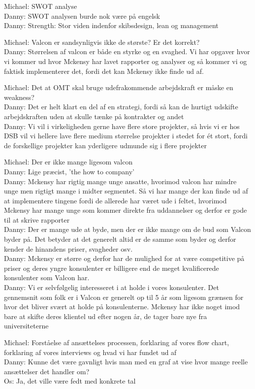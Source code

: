 \begin{linenumbers*}
Michael: SWOT analyse\\
Danny: SWOT analysen burde nok være på engelsk\\
Danny: Strength: Stor viden indenfor skibsdesign, lean og management

Michael: Valcon er sandsynligvis ikke de største? Er det korrekt?\\
Danny: Størrelsen af valcon er både en styrke og en svaghed. Vi har opgaver hvor vi kommer ud hvor Mckensy har lavet rapporter og analyser og så kommer vi og faktisk implementerer det, fordi det kan Mckensy ikke finde ud af.

Michael: Det at OMT skal bruge udefrakommende arbejdskraft er måske en weakness?\\
Danny: Det er helt klart en del af en strategi, fordi så kan de hurtigt udskifte arbejdskraften uden at skulle tænke på kontrakter og andet\\
Danny: Vi vil i virkeligheden gerne have flere store projekter, så hvis vi er hos DSB vil vi hellere lave flere medium størrelse projekter i stedet for ét stort, fordi de forskellige projekter kan yderligere udmunde sig i flere projekter

Michael: Der er ikke mange ligesom valcon\\
Danny: Lige præcist, 'the how to company'\\
Danny: Mckensy har rigtig mange unge ansatte, hvorimod valcon har mindre unge men rigtigt mange i midter segmentet. Så vi har mange der kan finde ud af at implementere tingene fordi de allerede har været ude i feltet, hvorimod Mckensy har mange unge som kommer direkte fra uddannelser og derfor er gode til at skrive rapporter\\
Danny: Der er mange ude at byde, men der er ikke mange om de bud som Valcon byder på. Det betyder at det generelt altid er de samme som byder og derfor kender de hinandens priser, svagheder osv.\\
Danny: Mckensy er større og derfor har de mulighed for at være competitive på priser og deres yngre konsulenter er billigere end de meget kvalificerede konsulenter som Valcon har.\\
Danny: Vi er selvfølgelig interesseret i at holde i vores konsulenter. Det gennemsnit som folk er i Valcon er generelt op til 5 år som ligesom grænsen for hvor det bliver svært at holde på konsulenterne. Mckensy har ikke noget imod bare at skifte deres klientel ud efter nogen år, de tager bare nye fra universiteterne

Michael: Forståelse af ansættelses processen, forklaring af vores flow chart, forklaring af vores interviews og hvad vi har fundet ud af\\
Danny: Kunne det være gavnligt hvis man med en graf at vise hvor mange reelle ansættelser det handler om?\\
Os: Ja, det ville være fedt med konkrete tal


\end{linenumbers*}
